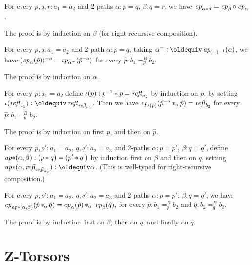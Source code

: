 \documentclass[a4paper,12pt]{amsart}
\begin{document}
\begin{lemma}\label{lem:functorial-change-path}
  For every $p,q,r:a_1=a_2$ and 2-paths $\alpha : p = q$, $\beta : q = r$,
  we have $\mathit{cp}_{\alpha*\beta}=\mathit{cp}_{\beta}\circ\mathit{cp}_{\alpha}$.
\end{lemma}

The proof is by induction on $\beta$ (for right-recursive composition).

\begin{lemma}\label{lem:inv2-change-path}
  For every  $p,q:a_1=a_2$ and 2-path $\alpha : p = q$, taking
  $\alpha^- \defeq \ap{(\_)^{-1}}(\alpha)$, we have
  $(\mathit{cp}_{\alpha}(\hat p))^{-o} = \mathit{cp}_{\alpha^-}(\hat p^{-o})$
  for every $\hat p: b_1=^B_p b_2$.
\end{lemma}
 The proof is by induction on $\alpha$.

\begin{lemma}\label{lem:invlaw-change-path}
  For every  $p :a_1 = a_2$ define $\iota(p): p^{-1}* p = \mathop{{\it refl}_{a_2}}$
  by induction on $p$, by setting $\iota(\refl{a_1})\defeq \refl{\refl{a_1}}$.
  Then we have $\mathit{cp}_{\iota(p)}(\hat p^{-o} *_{\mathrm{o}} {\hat p}) = \mathop{{\it refl}_{b_2}}$
  for every $\hat p: b_1=^B_p b_2$.
\end{lemma}
 The proof is by induction on first $p$, and then on $\hat p$.


\begin{definition}\label{lem:compo-ap-ap}
  For every  $p,p':a_1=a_2$, $q,q':a_2=a_3$ and 2-paths 
  $\alpha : p = p'$, $\beta : q = q'$, define
  $\mathop{{\it ap}{*}}(\alpha,\beta): (p* q)=(p'* q')$ by induction
  first on $\beta$ and then on $q$, 
  setting $\apc(\alpha,\refl{\refl{a_2}}) \defeq \alpha$.
  (This is well-typed for right-recursive composition.)
\end{definition}

\begin{lemma}\label{lem:compo-change-path}
  For every  $p,p':a_1=a_2$, $q,q':a_2=a_3$ and 2-paths 
  $\alpha : p = p'$, $\beta : q = q'$, we have
  $\cp{\apc(\alpha,\beta)}(\hat p \cto \hat q) = 
   \cp{\alpha}(\hat p) \cto  \cp{\beta}(\hat q),$
  for every $\hat p: b_1=^B_p b_2$ and $\hat q: b_2=^B_q b_3$.
\end{lemma}
 The proof is by induction first on $\beta$, then on $q$, and finally on $\hat q$.




\section{Z-Torsors}\label{sec:ZTorsors}
\end{document}
